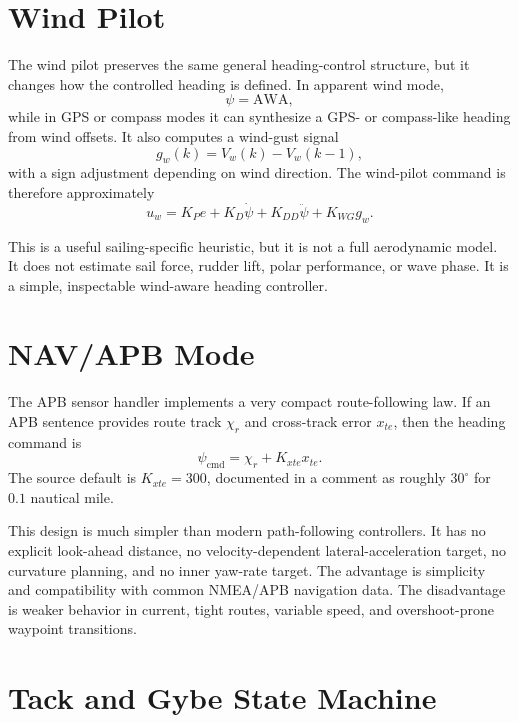 \documentclass[11pt,twocolumn]{article}
\newcommand{\heading}{\psi}
\newcommand{\cmd}{\mathrm{cmd}}
\newcommand{\AWA}{\mathrm{AWA}}
\begin{document}
\section{Wind Pilot}

The wind pilot preserves the same general heading-control structure, but it changes how
the controlled heading is defined.  In apparent wind mode,
\begin{equation}
  \heading = \AWA,
\end{equation}
while in GPS or compass modes it can synthesize a GPS- or compass-like heading from wind
offsets.  It also computes a wind-gust signal
\begin{equation}
  g_w(k) = V_w(k)-V_w(k-1),
\end{equation}
with a sign adjustment depending on wind direction.  The wind-pilot command is therefore
approximately
\begin{equation}
  u_w = K_P e + K_D\dot{\heading} + K_{DD}\ddot{\heading} + K_{WG}g_w.
  \label{eq:wind}
\end{equation}

This is a useful sailing-specific heuristic, but it is not a full aerodynamic model.  It
does not estimate sail force, rudder lift, polar performance, or wave phase.  It is a
simple, inspectable wind-aware heading controller.

\section{NAV/APB Mode}

The APB sensor handler implements a very compact route-following law.  If an APB sentence
provides route track \(\chi_r\) and cross-track error \(x_{te}\), then the heading command
is
\begin{equation}
  \heading_{\cmd} = \chi_r + K_{xte} x_{te}.
  \label{eq:apb}
\end{equation}
The source default is \(K_{xte}=300\), documented in a comment as roughly
\(30^{\circ}\) for \(0.1\) nautical mile.

This design is much simpler than modern path-following controllers.  It has no explicit
look-ahead distance, no velocity-dependent lateral-acceleration target, no curvature
planning, and no inner yaw-rate target.  The advantage is simplicity and compatibility
with common NMEA/APB navigation data.  The disadvantage is weaker behavior in current,
tight routes, variable speed, and overshoot-prone waypoint transitions.

\section{Tack and Gybe State Machine}
\end{document}
